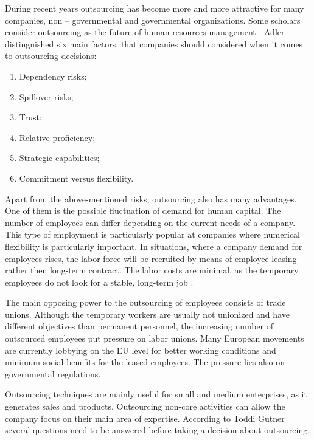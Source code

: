 \documentclass[a4paper,fleqn,11pt,dvips,titlepage]{article}
\numberwithin{figure}{section}
\numberwithin{equation}{section}
\begin{document}
During recent years outsourcing has become more and more attractive for many companies, non – governmental and governmental organizations.
Some scholars consider outsourcing as the future of human resources management \cite{adler2003making}.
Adler distinguished six main factors, that companies should considered when it comes to outsourcing decisions:
\begin{enumerate}
  \item Dependency risks;
  \item Spillover risks;
  \item Trust;
  \item Relative proficiency;
  \item Strategic capabilities;
  \item Commitment versus flexibility.
\end{enumerate}
Apart from the above-mentioned risks, outsourcing also has many advantages.
One of them is the possible fluctuation of demand for human capital.
The number of employees can differ depending on the current needs of a company.
This type of employment is particularly popular at companies where numerical flexibility is particularly important.
In situations, where a company demand for employees rises, the labor force will be recruited by means of employee leasing rather then long-term contract.
The labor costs are minimal, as the temporary employees do not look for a stable, long-term job \cite{stefan}. 

The main opposing power to the outsourcing of employees consists of trade unions.
Although the temporary workers are usually not unionized and have different objectives than permanent personnel,
the increasing number of outsourced employees put pressure on labor unions.
Many European movements are currently lobbying on the EU level for better working conditions and minimum social benefits for the leased employees.
The pressure lies also on governmental regulations. 

Outsourcing techniques are mainly useful for small and medium enterprises, as it generates sales and products.
Outsourcing non-core activities can allow the company focus on their main area of expertise.
According to Toddi Gutner several questions need to be answered before taking a decision about outsourcing.
\end{document}
